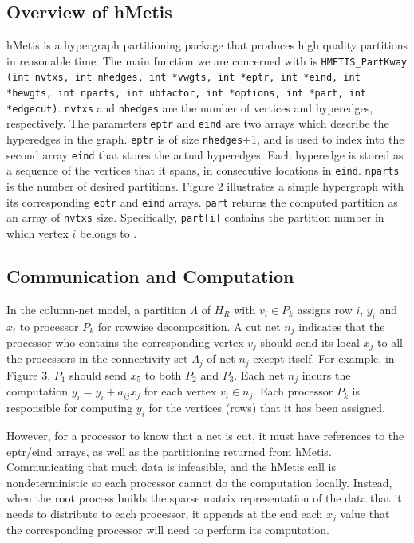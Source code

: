 \documentclass{article}
\begin{document}
\subsection{Overview of hMetis}

hMetis is a hypergraph partitioning package that produces high quality partitions in reasonable time. The main function we are concerned with is \texttt{HMETIS\_PartKway (int nvtxs, int nhedges, int *vwgts, int *eptr, int *eind, int *hewgts, int nparts, int ubfactor, int *options, int *part, int *edgecut)}. \texttt{nvtxs} and \texttt{nhedges} are the number of vertices and hyperedges, respectively. The parameters \texttt{eptr} and \texttt{eind} are two arrays which describe the hyperedges in the graph. \texttt{eptr} is of size \texttt{nhedges}+1, and is used to index into the second array \texttt{eind} that stores the actual hyperedges. Each hyperedge is stored as a sequence of the vertices that it spans, in consecutive locations in \texttt{eind}. \texttt{nparts} is the number of desired partitions. Figure 2 illustrates a simple hypergraph with its corresponding \texttt{eptr} and \texttt{eind} arrays. \texttt{part} returns the computed partition as an array of \texttt{nvtxs} size. Specifically, \texttt{part[i]} contains the partition number in which vertex \(i\) belongs to \cite{hmetis} \cite{cata2}. 

\subsection{Communication and Computation}

In the column-net model, a partition \(\Lambda\) of \(H_{R}\) with \(v_{i} \in P_{k}\) assigns row \(i\), \(y_{i}\) and \(x_{i}\) to processor \(P_{k}\) for rowwise decomposition. A cut net \(n_{j}\) indicates that the processor who contains the corresponding vertex \(v_{j}\) should send its local \(x_{j}\) to all the processors in the connectivity set \(\Lambda _{j}\) of net \(n_{j}\) except itself. For example, in Figure 3, \(P_{1}\) should send \(x_{5}\) to both \(P_{2}\) and \(P_{3}\). Each net \(n_{j}\) incurs the computation \(y_{i} = y_{i} + a_{ij}x_{j}\) for each vertex \(v_{i} \in n_{j}\). Each processor \(P_{k}\) is responsible for computing \(y_{i}\) for the vertices (rows) that it has been assigned.

However, for a processor to know that a net is cut, it must have references to the eptr/eind arrays, as well as the partitioning returned from hMetis. Communicating that much data is infeasible, and the hMetis call is nondeterministic so each processor cannot do the computation locally. Instead, when the root process builds the sparse matrix representation of the data that it needs to distribute to each processor, it appends at the end each \(x_{j}\) value that the corresponding processor will need to perform its computation.
\end{document}
